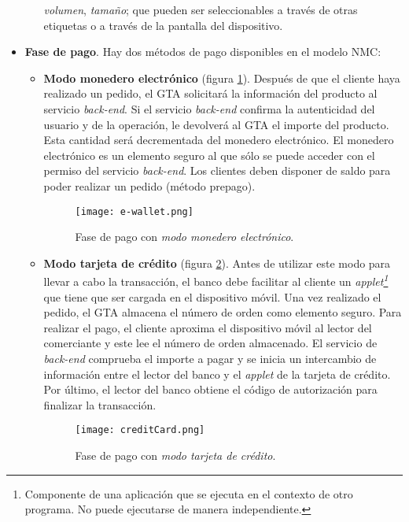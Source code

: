 \begin{itemize}
\begin{itemize}
    \emph{volumen}, \emph{tamaño}; que pueden ser seleccionables a través
    de otras etiquetas o a través de la pantalla del dispositivo.
    \end{itemize}
  \item \textbf{Fase de pago}. Hay dos métodos de pago disponibles en el
  modelo \acs{NMC}:
    \begin{itemize}
    \item \textbf{Modo monedero electrónico} (figura \ref{fig:e-wallet}). 
    Después de que el cliente haya realizado un pedido, el \acs{GTA} 
    solicitará la información del producto al servicio \emph{back-end}. Si el 
    servicio \emph{back-end} confirma la autenticidad del usuario y de la 
    operación, le devolverá al \acs{GTA} el importe del producto. Esta 
    cantidad será decrementada del monedero electrónico. El monedero 
    electrónico es un elemento seguro al que sólo se puede acceder con el 
    permiso del servicio \emph{back-end}. Los clientes deben disponer de saldo 
    para poder realizar un pedido (método prepago).

    \begin{figure}[!h]
      \begin{center}
        \texttt{[image: e-wallet.png]}
        \caption{Fase de pago con \emph{modo monedero electrónico}.}
        \label{fig:e-wallet}
      \end{center}
    \end{figure}

    \item \textbf{Modo tarjeta de crédito} (figura \ref{fig:creditCard}). 
    Antes de utilizar este modo para llevar a cabo la transacción, el banco 
    debe facilitar al cliente un \emph{applet\footnote{Componente de una 
    aplicación que se ejecuta en el contexto de otro programa. No puede 
    ejecutarse de manera independiente.}} que tiene que ser cargada en el 
    dispositivo móvil. Una vez realizado el pedido, el \acs{GTA} almacena el 
    número de orden como elemento seguro. Para realizar el pago, el cliente 
    aproxima el dispositivo móvil al lector del comerciante y este lee el 
    número de orden almacenado. El servicio de \emph{back-end} comprueba el 
    importe a pagar y se inicia un intercambio de información entre el lector 
    del banco y el \emph{applet} de la tarjeta de crédito. Por último, el 
    lector del banco obtiene el código de autorización para finalizar la 
    transacción.
  
    \begin{figure}[!h]
      \begin{center}
        \texttt{[image: creditCard.png]}
        \caption{Fase de pago con \emph{modo tarjeta de crédito}.}
        \label{fig:creditCard}
      \end{center}
    \end{figure}


\end{itemize}
\end{itemize}
